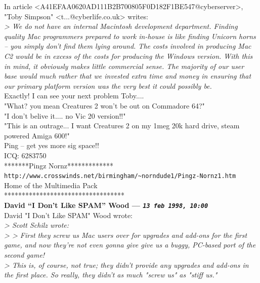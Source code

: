 \documentclass[11pt,twoside,a4paper]{article}
\begin{document}
\begin{multicols*}{2}
In article <A41EFAA0620AD111B2B700805F0D182F1BE547@cyberserver>, "Toby Simpson" <t...@cyberlife.co.uk> writes:~\\
\emph{> We do not have an internal Macintosh development department. Finding quality Mac programmers prepared to work in-house is like finding Unicorn horns -- you simply don't find them lying around. The costs involved in producing Mac C2 would be in excess of the costs for producing the Windows version. With this in mind, it obviously makes little commercial sense. The majority of our user base would much rather that we invested extra time and money in ensuring that our primary platform version was the very best it could possibly be.}~\\

Exactly! I can see your next problem Toby....~\\

"What? you mean Creatures 2 won't be out on Commadore 64?"~\\

"I don't belive it.... no Vic 20 version!!"~\\

"This is an outrage... I want Creatures 2 on my 1meg 20k hard drive, steam powered Amiga 600!"~\\

Ping -- get yes more sig space!!~\\
ICQ:  6283750~\\
*******Pingz Nornz*************~\\
\texttt{http://www.crosswinds.net/birmingham/\textasciitilde norndude1/Pingz-Nornz1.htm}~\\
Home of the Multimedia Pack~\\
**********************************~\\

 
		
	
		
\textbf{David ``I Don't Like SPAM'' Wood --- \emph{\texttt{13 feb 1998, 10:00}}}~\\

David "I Don't Like SPAM" Wood wrote:~\\
\emph{> Scott Schilz wrote:}~\\
\emph{> > First they screw us Mac users over for upgrades and add-ons for the first game, and now they're not even gonna give give us a buggy, PC-based port of the second game!}~\\
\emph{> This is, of course, not true; they didn't provide any upgrades and add-ons in the first place. So really, they didn't as much "screw us" as "stiff us."}~\\


\end{multicols*}
\end{document}
